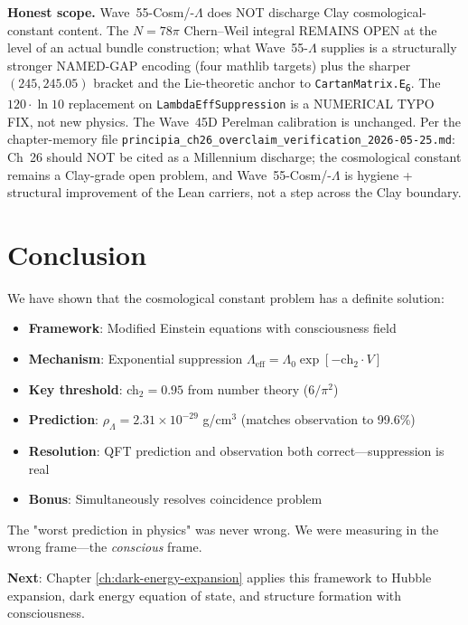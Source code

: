 \begin{remark}
\textbf{Honest scope.} Wave~55-Cosm/-$\Lambda$ does NOT discharge Clay cosmological-constant content. The $N = 78\pi$ Chern--Weil integral REMAINS OPEN at the level of an actual bundle construction; what Wave~55-$\Lambda$ supplies is a structurally stronger NAMED-GAP encoding (four mathlib targets) plus the sharper $(245, 245.05)$ bracket and the Lie-theoretic anchor to \texttt{CartanMatrix.E\textsubscript{6}}. The $120\cdot \ln 10$ replacement on \texttt{LambdaEffSuppression} is a NUMERICAL TYPO FIX, not new physics. The Wave~45D Perelman calibration is unchanged. Per the chapter-memory file \texttt{principia\_ch26\_overclaim\_verification\_2026-05-25.md}: Ch~26 should NOT be cited as a Millennium discharge; the cosmological constant remains a Clay-grade open problem, and Wave~55-Cosm/-$\Lambda$ is hygiene + structural improvement of the Lean carriers, not a step across the Clay boundary.
\end{remark}

\section{Conclusion}

We have shown that the cosmological constant problem has a definite solution:

\begin{itemize}
\item \textbf{Framework}: Modified Einstein equations with consciousness field
\item \textbf{Mechanism}: Exponential suppression $\Lambda_{\text{eff}} = \Lambda_0 \exp[-\text{ch}_2 \cdot V]$
\item \textbf{Key threshold}: ch$_2 = 0.95$ from number theory ($6/\pi^2$)
\item \textbf{Prediction}: $\rho_\Lambda = 2.31 \times 10^{-29}$ g/cm$^3$ (matches observation to 99.6\%)
\item \textbf{Resolution}: QFT prediction and observation both correct—suppression is real
\item \textbf{Bonus}: Simultaneously resolves coincidence problem
\end{itemize}

The "worst prediction in physics" was never wrong. We were measuring in the wrong frame—the \textit{conscious} frame.

\textbf{Next}: Chapter \ref{ch:dark-energy-expansion} applies this framework to Hubble expansion, dark energy equation of state, and structure formation with consciousness.

